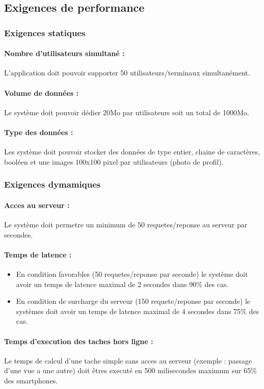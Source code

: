 \documentclass{article}
\begin{document}
\subsection{Exigences de performance}
\subsubsection{Exigences statiques}
\paragraph{Nombre d'utilisateurs simultané :}
L'application doit pouvoir supporter 50 utilisateurs/terminaux
simultanément.
\paragraph{Volume de données :}
Le système doit pouvoir dédier 20Mo par utilisateurs soit un total de
1000Mo.
\paragraph{Type des données :}
Les système doit pouvoir stocker des données de type entier, chaine de
caractères, booléen et une images 100x100 pixel par utilisateurs
(photo de profil).  


\subsubsection{Exigences dymamiques}
\paragraph{Acces au serveur :}
Le système doit permetre un minimum de 50 requetes/reponse au serveur
par secondes. 
\paragraph{Temps de latence :}
\begin{itemize}
\item En condition favorables (50 requetes/reponse par seconde) le
  système doit avoir un temps de latence maximal de 2 secondes dans
  90\% des cas.
\item En condition de surcharge du serveur (150 requete/reponse par
  seconde) le systèmes doit avoir un temps de latence maximal de 4
  secondes dans 75\% des cas.
\end{itemize}

\paragraph{Temps d'execution des taches hors ligne :}
Le temps de calcul d'une tache simple sans acces au serveur (exemple : passage d'une vue a
une autre) doit êtres executé en 500 milisecondes maximum sur 65\% des
smartphones.
\end{document}
